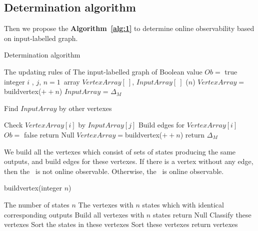  \subsection{Determination algorithm}
 Then we propose the {\bf Algorithm~\ref{alg:1}} to determine online observability based on input-labelled graph.%

\begin{algorithm}[h]
\caption{Determination algorithm}
\begin{algorithmic}[1]
\REQUIRE 
The updating rules of \BCN
\ENSURE  
The input-labelled graph of \BCN
\STATE Boolean value $Ob=$ true 
\STATE integer $i$ , $j$, $n=1$\
\STATE array $VertexArray[\ ]$, $InputArray[\ ]$
($n$)
\STATE $VertexArray=${\sf buildvertex}($++n$)
\STATE $InputArray$ = $\Delta_M$ 
\ELSE

\STATE Find $InputArray$ by other vertexes

\ENDIF
{}
\STATE Check $VertexArray[i]$ by $InputArray[j]$ 
\STATE Build edges for $VertexArray[i]$ 
\ENDFOR
{}
\STATE  $Ob=$ false 
\STATE return Null
\ENDIF
\ENDFOR
\STATE $VertexArray=${\sf buildvertex}($++n$)
\ENDWHILE
\STATE return $\Delta_M$\
\end{algorithmic}
 \label{alg:1}
\end{algorithm}


 We build all the vertexes which consist of sets of states producing the same outputs, and build edges for these vertexes. If there is a vertex without any edge, then the \BCN\ is not online observable. Otherwise, the \BCN\ is online observable.

\begin{algorithm}[h!]
\caption{{\sf buildvertex}(integer $n$)}
\begin{algorithmic}[1]
\REQUIRE 
The number of states $n$
\ENSURE  
The vertexes with $n$ states which with identical corresponding outputs 
\STATE  Build all vertexes with $n$ states 
\IF{(Failed to build)} 
\STATE  return Null
\ELSE 
\STATE  Classify these vertexes
\STATE Sort the states in these vertexes
\STATE Sort these vertexes
\STATE return vertexes
\ENDIF 
\end{algorithmic}
 \label{alg:2}
\end{algorithm}

